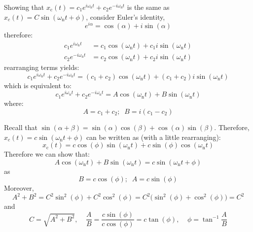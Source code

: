 \documentclass[12pt,letter]{article}
\begin{document}
\begin{mdframed}[middlelinewidth=0.5mm]
\begin{center}
\end{center}
Showing that $x_\text{c}(t) = c_1 e ^{i \omega_\text{n} t} + c_2 e ^{-i \omega_\text{n} t} $ is the same as $x_c(t) = C \sin(\omega_\text{n} t + \phi) $, consider Euler's identity, 
\begin{equation}
e^{i \alpha} = \cos(\alpha) + i \sin(\alpha)
\end{equation}
therefore:
\begin{align}
c_1 e ^{i \omega_\text{n} t}   &= c_1 \cos(\omega_\text{n} t) + c_1 i \sin(\omega_\text{n} t)  \\
c_2 e ^{- i \omega_\text{n} t}   &= c_2 \cos(\omega_\text{n} t) + c_2 i \sin(\omega_\text{n} t)   \nonumber
\end{align}
rearranging terms yields:
\begin{equation}
c_1 e ^{i \omega_\text{n} t} + c_2 e ^{- i \omega_\text{n} t}  = (c_1+c_2) \cos(\omega_\text{n} t) + (c_1+c_2) i \sin(\omega_\text{n} t) 
\end{equation}
which is equivalent to:
\begin{equation}
c_1 e ^{i \omega_\text{n} t} + c_2 e ^{- i \omega_\text{n} t}  = A \cos(\omega_\text{n} t) + B \sin(\omega_\text{n} t) 
\end{equation}
where:
\begin{equation}
A = c_1 + c_2; \;\; B = i(c_1 - c_2)
\end{equation}


Recall that $\sin(\alpha + \beta) = \sin(\alpha) \cos(\beta) + \cos(\alpha) \sin(\beta)$. Therefore, $x_c(t) = c \sin(\omega_\text{n} t + \phi)$ can be written as (with a little rearranging):
\begin{equation}
x_\text{c}(t) = c \cos(\phi) \sin(\omega_\text{n} t) + c \sin(\phi) \cos(\omega_\text{n} t)
\end{equation}
Therefore we can show that: 
\begin{equation}
A \cos(\omega_\text{n} t) + B \sin(\omega_\text{n} t) = c \sin(\omega_\text{n} t + \phi) 
\end{equation}
as
\begin{equation}
B = c\cos(\phi); \;\; A = c\sin(\phi)
\end{equation}
Moreover, 
\begin{equation}
A^2 + B^2 = C^2 \sin^2(\phi) + C^2 \cos^2(\phi) = C^2 \big(  \sin^2(\phi) + \cos^2(\phi)\big) = C^2
\end{equation}
and 
\begin{equation}
C = \sqrt{A^2 + B^2}, \;\;\;\;  \frac{A}{B} = \frac{c \sin(\phi)}{c \cos(\phi)} = c \tan(\phi), \;\;\;\;  \phi = \tan^{-1} \frac{A}{B}
\end{equation}

\end{mdframed}
\end{document}
